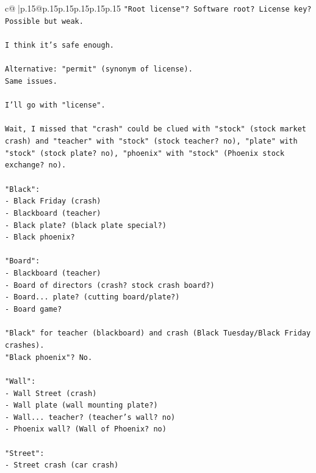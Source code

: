\documentclass{article}
\begin{document}
{\begin{supertabular}{c@{$\;$}|p{.15\linewidth}@{}p{.15\linewidth}p{.15\linewidth}p{.15\linewidth}p{.15\linewidth}p{.15\linewidth}}
{{{\texttt{"Root license"? Software root? License key? Possible but weak.} \\
\\ 
\texttt{I think it's safe enough.} \\
\\ 
\texttt{Alternative: "permit" (synonym of license).} \\
\texttt{Same issues.} \\
\\ 
\texttt{I'll go with "license".} \\
\\ 
\texttt{Wait, I missed that "crash" could be clued with "stock" (stock market crash) and "teacher" with "stock" (stock teacher? no), "plate" with "stock" (stock plate? no), "phoenix" with "stock" (Phoenix stock exchange? no).} \\
\\ 
\texttt{"Black":} \\
\texttt{{-} Black Friday (crash)} \\
\texttt{{-} Blackboard (teacher)} \\
\texttt{{-} Black plate? (black plate special?)} \\
\texttt{{-} Black phoenix?} \\
\\ 
\texttt{"Board":} \\
\texttt{{-} Blackboard (teacher)} \\
\texttt{{-} Board of directors (crash? stock crash board?)} \\
\texttt{{-} Board... plate? (cutting board/plate?)} \\
\texttt{{-} Board game?} \\
\\ 
\texttt{"Black" for teacher (blackboard) and crash (Black Tuesday/Black Friday crashes).} \\
\texttt{"Black phoenix"? No.} \\
\\ 
\texttt{"Wall":} \\
\texttt{{-} Wall Street (crash)} \\
\texttt{{-} Wall plate (wall mounting plate?)} \\
\texttt{{-} Wall... teacher? (teacher's wall? no)} \\
\texttt{{-} Phoenix wall? (Wall of Phoenix? no)} \\
\\ 
\texttt{"Street":} \\
\texttt{{-} Street crash (car crash)} \\
}}}
\end{supertabular}}
\end{document}
